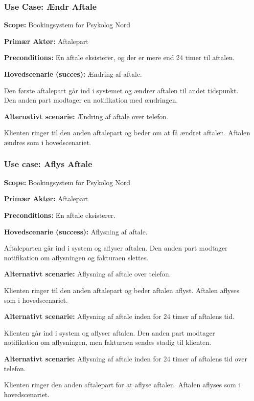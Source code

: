\subsubsection{Use Case: Ændr Aftale}
{\setlength{\parindent}{0cm}
\textbf{Scope:} Bookingsystem for Psykolog Nord

\textbf{Primær Aktør:} Aftalepart 

\textbf{Preconditions:} En aftale eksisterer, og der er mere end 24 timer til aftalen.

\textbf{Hovedscenarie (succes):} Ændring af aftale.

Den første aftalepart går ind i systemet og ændrer aftalen til andet tidspunkt.
Den anden part modtager en notifikation med ændringen.

\textbf{Alternativt scenarie:} Ændring af aftale over telefon.

Klienten ringer til den anden aftalepart og beder om at få ændret aftalen. Aftalen ændres som i hovedscenariet.
}

\subsubsection{Use case: Aflys Aftale}
{\setlength{\parindent}{0cm}
\textbf{Scope:} Bookingsystem for Psykolog Nord

\textbf{Primær Aktør:} Aftalepart

\textbf{Preconditions:} En aftale eksisterer.

\textbf{Hovedscenarie (success):} Aflysning af aftale.

Aftaleparten går ind i system og aflyser aftalen.
Den anden part modtager notifikation om aflysningen og fakturaen slettes.

\textbf{Alternativt scenarie:} Aflysning af aftale over telefon.

Klienten ringer til den anden aftalepart og beder aftalen aflyst.
Aftalen aflyses som i hovedscenariet.

\textbf{Alternativt scenarie:} Aflysning af aftale inden for 24 timer af aftalens tid.

Klienten går ind i system og aflyser aftalen.
Den anden part modtager notifikation om aflysningen, men fakturaen sendes stadig til klienten.

\textbf{Alternativt scenarie:} Aflysning af aftale inden for 24 timer af aftalens tid over telefon.

Klienten ringer den anden aftalepart for at aflyse aftalen. Aftalen aflyses som i hovedscenariet.
}
